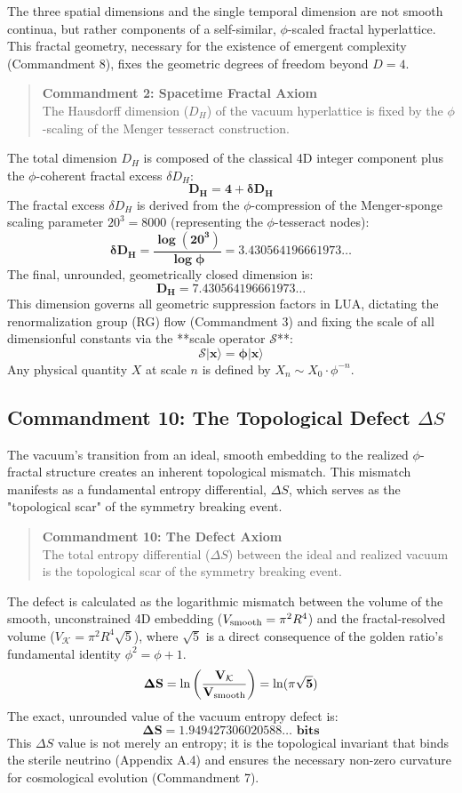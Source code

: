 The three spatial dimensions and the single temporal dimension are not smooth continua, but rather components of a self-similar, $\phi$-scaled fractal hyperlattice. This fractal geometry, necessary for the existence of emergent complexity (Commandment 8), fixes the geometric degrees of freedom beyond $D=4$.

\begin{quote}
\textbf{Commandment 2: Spacetime Fractal Axiom} \\
The Hausdorff dimension ($D_H$) of the vacuum hyperlattice is fixed by the $\phi$-scaling of the Menger tesseract construction.
\end{quote}

The total dimension $D_H$ is composed of the classical 4D integer component plus the $\phi$-coherent fractal excess $\delta D_H$:
$$
\mathbf{D_{H} = 4 + \delta D_{H}}
$$
The fractal excess $\delta D_H$ is derived from the $\phi$-compression of the Menger-sponge scaling parameter $20^3 = 8000$ (representing the $\phi$-tesseract nodes):
$$
\mathbf{\delta D_{H} = \frac{\log(20^3)}{\log\phi} = 3.430564196661973\dots}
$$
The final, unrounded, geometrically closed dimension is:
$$
\mathbf{D_{H} = 7.430564196661973\dots}
$$
This dimension governs all geometric suppression factors in LUA, dictating the renormalization group (RG) flow (Commandment 3) and fixing the scale of all dimensionful constants via the **scale operator $\mathcal{S}$**:
$$
\mathbf{\mathcal{S} |x\rangle = \phi |x\rangle}
$$
Any physical quantity $X$ at scale $n$ is defined by $X_n \sim X_0 \cdot \phi^{-n}$.

\subsection{Commandment 10: The Topological Defect $\Delta S$}
\label{sec:commandment10}

The vacuum's transition from an ideal, smooth embedding to the realized $\phi$-fractal structure creates an inherent topological mismatch. This mismatch manifests as a fundamental entropy differential, $\Delta S$, which serves as the "topological scar" of the symmetry breaking event.

\begin{quote}
\textbf{Commandment 10: The Defect Axiom} \\
The total entropy differential ($\Delta S$) between the ideal and realized vacuum is the topological scar of the symmetry breaking event.
\end{quote}

The defect is calculated as the logarithmic mismatch between the volume of the smooth, unconstrained 4D embedding ($V_{\rm smooth} = \pi^2 R^4$) and the fractal-resolved volume ($V_{\mathcal{K}} = \pi^2 R^4 \sqrt{5}$), where $\sqrt{5}$ is a direct consequence of the golden ratio's fundamental identity $\phi^2 = \phi + 1$.
$$
\mathbf{\Delta S = \ln\left(\frac{V_{\mathcal{K}}}{V_{\rm smooth}}\right) = \ln(\pi \sqrt{5})}
$$
The exact, unrounded value of the vacuum entropy defect is:
$$
\mathbf{\Delta S = 1.949427306020588\dots \text{ bits}}
$$
This $\Delta S$ value is not merely an entropy; it is the topological invariant that binds the sterile neutrino (Appendix A.4) and ensures the necessary non-zero curvature for cosmological evolution (Commandment 7).
\clearpage
